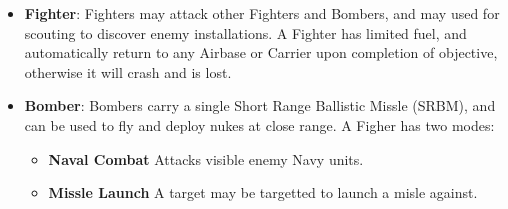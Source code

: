          \begin{itemize}
         \item \textbf{Fighter}: Fighters may attack other Fighters and Bombers, and may used for scouting to discover enemy installations. A Fighter has limited fuel, and automatically return to any Airbase or Carrier upon completion of objective, otherwise it will crash and is lost.
         \item \textbf{Bomber}: Bombers carry a single Short Range Ballistic Missle (SRBM), and can be used to fly and deploy nukes at close range. A Figher has two modes:
            \begin{itemize}
               \item \textbf{Naval Combat} Attacks visible enemy Navy units.
               \item \textbf{Missle Launch} A target may be targetted to launch a misle against.   
            \end{itemize}
         \end{itemize}    

